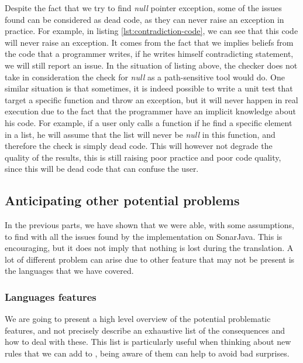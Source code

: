 Despite the fact that we try to find \emph{null} pointer exception, some of the issues found can be considered as dead code, as they can never raise an exception in practice. 
For example, in listing \ref{lst:contradiction-code}, we can see that this code will never raise an exception. 
It comes from the fact that we implies beliefs from the code that a programmer writes, if he writes himself contradicting statement, we will still report an issue. 
In the situation of listing above, the checker does not take in consideration the check for \emph{null} as a path-sensitive tool would do. \newline
One similar situation is that sometimes, it is indeed possible to write a unit test that target a specific function and throw an exception, but it will never happen in real execution due to the fact that the programmer have an implicit knowledge about his code. 
For example, if a user only calls a function if he find a specific element in a list, he will assume that the list will never be \emph{null} in this function, and therefore the check is simply dead code. 
This will however not degrade the quality of the results, this is still raising poor practice and poor code quality, since this will be dead code that can confuse the user.

\subsection{Anticipating other potential problems}
\label{subsec:anticipating_problems}

In the previous parts, we have shown that we were able, with some assumptions, to find with \slang{} all the issues found by the implementation on SonarJava. 
This is encouraging, but it does not imply that nothing is lost during the translation.
A lot of different problem can arise due to other feature that may not be present is the languages that we have covered.

\subsubsection{Languages features}
\label{subsubsec:other_language_features}

We are going to present a high level overview of the potential problematic features, and not precisely describe an exhaustive list of the consequences and how to deal with these.
This list is particularly useful when thinking about new rules that we can add to \slang, being aware of them can help to avoid bad surprises.

